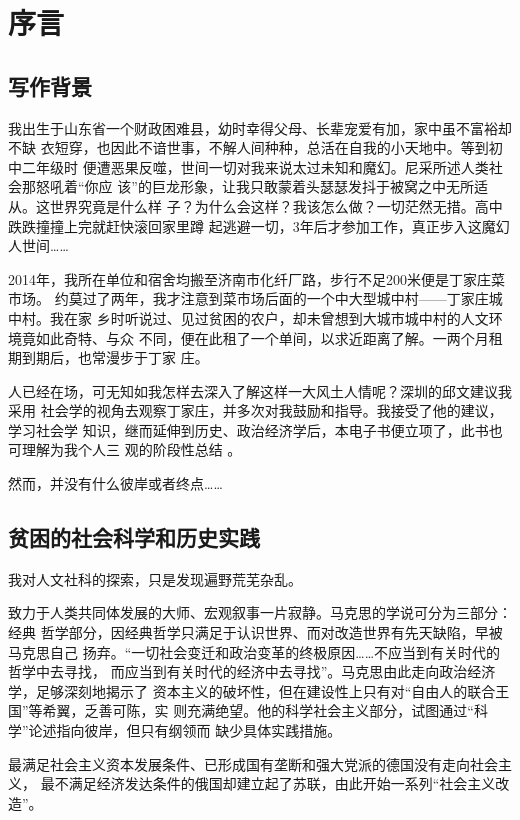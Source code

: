 \chapter{序言}
\label{chap:preface}

\section*{写作背景}

我出生于山东省一个财政困难县，幼时幸得父母、长辈宠爱有加，家中虽不富裕却不缺
衣短穿，也因此不谙世事，不解人间种种，总活在自我的小天地中。等到初中二年级时
便遭恶果反噬，世间一切对我来说太过未知和魔幻。尼采所述人类社会那怒吼着“你应
该”的巨龙形象，让我只敢蒙着头瑟瑟发抖于被窝之中无所适从。这世界究竟是什么样
子？为什么会这样？我该怎么做？一切茫然无措。高中跌跌撞撞上完就赶快滚回家里蹲
起逃避一切，3年后才参加工作，真正步入这魔幻人世间……

2014年，我所在单位和宿舍均搬至济南市化纤厂路，步行不足200米便是丁家庄菜市场。
约莫过了两年，我才注意到菜市场后面的一个中大型城中村——丁家庄城中村。我在家
乡时听说过、见过贫困的农户，却未曾想到大城市城中村的人文环境竟如此奇特、与众
不同，便在此租了一个单间，以求近距离了解。一两个月租期到期后，也常漫步于丁家
庄。

人已经在场，可无知如我怎样去深入了解这样一大风土人情呢？深圳的邱文建议我采用
社会学的视角去观察丁家庄，并多次对我鼓励和指导。我接受了他的建议，学习社会学
知识，继而延伸到历史、政治经济学后，本电子书便立项了，此书也可理解为我个人三
观的阶段性总结%
。

然而，并没有什么彼岸或者终点……

\section*{贫困的社会科学和历史实践}

我对人文社科的探索，只是发现遍野荒芜杂乱。

致力于人类共同体发展的大师、宏观叙事一片寂静。马克思的学说可分为三部分：经典
哲学部分，因经典哲学只满足于认识世界、而对改造世界有先天缺陷，早被马克思自己
扬弃。“一切社会变迁和政治变革的终极原因……不应当到有关时代的哲学中去寻找，
而应当到有关时代的经济中去寻找”。马克思由此走向政治经济学，足够深刻地揭示了
资本主义的破坏性，但在建设性上只有对“自由人的联合王国”等希翼，乏善可陈，实
则充满绝望。他的科学社会主义部分，试图通过“科学”论述指向彼岸，但只有纲领而
缺少具体实践措施。

最满足社会主义资本发展条件、已形成国有垄断和强大党派的德国没有走向社会主义，
最不满足经济发达条件的俄国却建立起了苏联，由此开始一系列“社会主义改造”。

